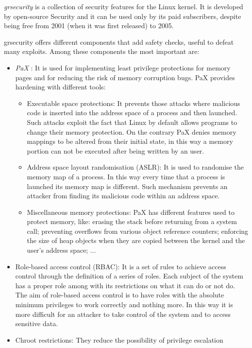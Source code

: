 \documentclass[a4paper,12pt]{article}
\begin{document}
\textit{grsecurity} \cite{wiki_grsecurity} is a collection of security features
for the Linux kernel. It is developed by open-source Security and it can be used
only by its paid subscribers, despite being free from 2001 (when it was first
released) to 2005.\par grsecurity offers different components that add safety
checks, useful to defeat many exploits. Among these components the most
important are:
\begin{itemize}
  \item \textit{PaX} \cite{wiki_PAX}: It is used for implementing least
  privilege protections for memory pages and for reducing the risk of memory
  corruption bugs. PaX provides hardening with different tools: 
  \begin{itemize}
    \item Executable space protections: It prevents those attacks
    where malicious code is inserted into the address space of a process and
    then launched. Such attacks exploit the fact that Linux by default allows
    programs to change their memory protection. On the contrary PaX denies
    memory mappings to be altered from their initial state, in this way a memory
    portion can not be executed after being written by an user. 
    \item Address space layout randomisation (ASLR): It is used to randomise the
    memory map of a process. In this way every time that a process is launched
    its memory map is different. Such mechanism prevents an attacker from
    finding its malicious code within an address space.
    \item Miscellaneous memory protections: PaX has different features used to
    protect memory, like: erasing the stack before returning from a system call;
    preventing overflows from various object reference counters; enforcing  the
    size of heap objects when they are copied between the kernel and the
    user's address space; ... 
  \end{itemize}
  \item Role-based access control (RBAC): It is a set of rules to achieve access
  control through the definition of a series of roles. Each subject of the
  system has a proper role among with its restrictions on what it can do or not
  do. The aim of role-based access control is to have roles with the absolute
  minimum privileges to work correctly and nothing more. In this way it is more
  difficult for an attacker to take control of the system and to access
  sensitive data.
  \item Chroot restrictions: They reduce the possibility of privilege escalation

\end{itemize}
\end{document}
